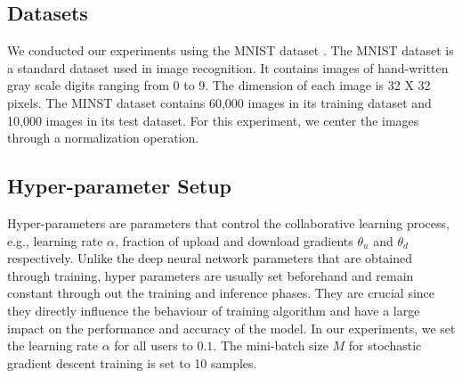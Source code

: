 \documentclass[conference]{IEEEtran}
\begin{document}



\subsection{Datasets}
We conducted our experiments using the MNIST dataset \cite{deng2012mnist}. The MNIST dataset is a standard dataset used in image
recognition. It contains images of hand-written gray scale digits ranging from 0 to 9. The dimension of each image is 32 X 32 pixels.
The MINST dataset contains 60,000 images in its training dataset and 10,000 images in its test dataset.
For this experiment, we center the images through a normalization operation.  

\subsection{Hyper-parameter Setup}


Hyper-parameters are parameters that control the collaborative learning process, e.g., learning rate $\alpha$, fraction of upload and download gradients $\theta_u$ and $\theta_d$ respectively. Unlike
the deep neural network parameters that are obtained through training, hyper parameters are usually set beforehand and remain
constant through out the training and inference phases. They are crucial since they directly influence the behaviour of training
algorithm and have a large impact on the performance and accuracy of the model. In our experiments, we set the learning rate $\alpha$ for all
users to $0.1$. 
The mini-batch size $M$ for stochastic gradient descent training is set to 10 samples.

 
\end{document}
